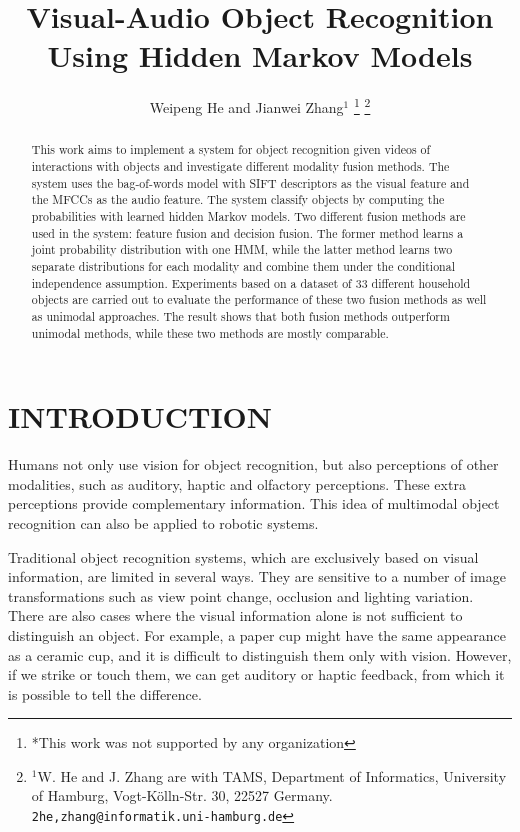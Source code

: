 \documentclass[letterpaper, 10 pt, conference]{ieeeconf}  %
\title{\LARGE \bf
Visual-Audio Object Recognition Using Hidden Markov Models
}
\author{Weipeng He and Jianwei Zhang$^{1}$%
\thanks{*This work was not supported by any organization}%
\thanks{$^{1}$W. He and J. Zhang are with TAMS, Department of Informatics, University of Hamburg, Vogt-K\"olln-Str. 30, 22527 Germany. {\tt\small 2he,zhang@informatik.uni-hamburg.de}}%
}
\begin{document}
\maketitle
\thispagestyle{empty}
\pagestyle{empty}

\begin{abstract}
This work aims to implement a system for object recognition given videos of interactions with objects and investigate different modality fusion methods. The system uses the bag-of-words model with SIFT descriptors as the visual feature and the MFCCs as the audio feature. The system classify objects by computing the probabilities with learned hidden Markov models. Two different fusion methods are used in the system: feature fusion and decision fusion. The former method learns a joint probability distribution with one HMM, while the latter method learns two separate distributions for each modality and combine them under the conditional independence assumption. Experiments based on a dataset of 33 different household objects are carried out to evaluate the performance of these two fusion methods as well as unimodal approaches. The result shows that both fusion methods outperform unimodal methods, while these two methods are mostly comparable. 
\end{abstract}

\section{INTRODUCTION}
Humans not only use vision for object recognition, but also perceptions of other modalities, such as auditory, haptic and olfactory perceptions. These extra perceptions provide complementary information. This idea of multimodal object recognition can also be applied to robotic systems.

Traditional object recognition systems, which are exclusively based on visual information, are limited in several ways. They are sensitive to a number of image transformations such as view point change, occlusion and lighting variation. There are also cases where the visual information alone is not sufficient to distinguish an object. For example, a paper cup might have the same appearance as a ceramic cup, and it is difficult to distinguish them only with vision. However, if we strike or touch them, we can get auditory or haptic feedback, from which it is possible to tell the difference.
\end{document}
